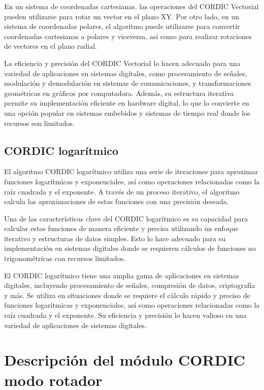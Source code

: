 \documentclass[12pt,a4paper, twoside]{article} %
\begin{document}
En un sistema de coordenadas cartesianas, las operaciones del CORDIC Vectorial pueden utilizarse para rotar un vector en el plano XY. Por otro lado, en un sistema de coordenadas polares, el algoritmo puede utilizarse para convertir coordenadas cartesianas a polares y viceversa, así como para realizar rotaciones de vectores en el plano radial.

La eficiencia y precisión del CORDIC Vectorial lo hacen adecuado para una variedad de aplicaciones en sistemas digitales, como procesamiento de señales, modulación y demodulación en sistemas de comunicaciones, y transformaciones geométricas en gráficos por computadora. Además, su estructura iterativa permite su implementación eficiente en hardware digital, lo que lo convierte en una opción popular en sistemas embebidos y sistemas de tiempo real donde los recursos son limitados.


\subsection{CORDIC logarítmico}
\label{sec:orgdaca22c}

El algoritmo CORDIC logarítmico utiliza una serie de iteraciones para aproximar funciones logarítmicas y exponenciales, así como operaciones relacionadas como la raíz cuadrada y el exponente. A través de un proceso iterativo, el algoritmo calcula las aproximaciones de estas funciones con una precisión deseada.

Una de las características clave del CORDIC logarítmico es su capacidad para calcular estas funciones de manera eficiente y precisa utilizando un enfoque iterativo y estructuras de datos simples. Esto lo hace adecuado para su implementación en sistemas digitales donde se requieren cálculos de funciones no trigonométricas con recursos limitados.

El CORDIC logarítmico tiene una amplia gama de aplicaciones en sistemas digitales, incluyendo procesamiento de señales, compresión de datos, criptografía y más. Se utiliza en situaciones donde se requiere el cálculo rápido y preciso de funciones logarítmicas y exponenciales, así como operaciones relacionadas como la raíz cuadrada y el exponente. Su eficiencia y precisión lo hacen valioso en una variedad de aplicaciones de sistemas digitales.


\newpage

\section{Descripción del módulo CORDIC modo rotador}
\label{sec:descripcion}
\end{document}
